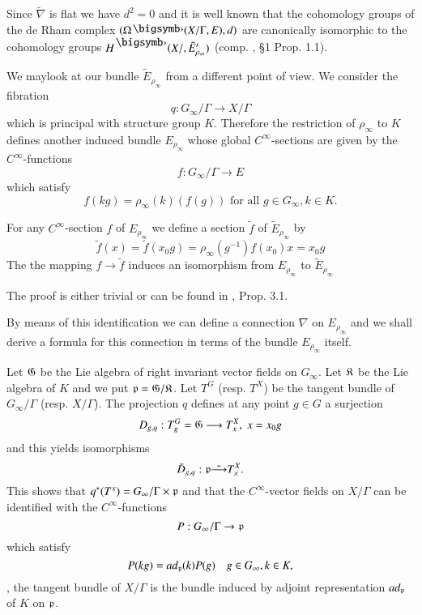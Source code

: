 Since $\tilde{\nabla}$ is flat we have $d^2 = 0$ and it is well known that the cohomology groups of the de Rham complex $(\Omega \bigdot (X/ \Gamma, E), d)$ are canonically isomorphic to the cohomology groups $H^\bigdot (X/ {}, \tilde{E}'_{\rho_\infty})$ (comp. \cite{art5-key10}, \S 1 Prop. 1.1).

We may\pageoriginale look at our bundle $\tilde{E}_{\rho_\infty}$ from a different point of view. We consider the fibration
$$
q : G_\infty/ \Gamma \to X / \Gamma
$$
which is principal with structure group $K$. Therefore the restriction of $\rho_\infty$ to $K$ defines another induced bundle $E_{\rho_\infty}$ whose global $C^{\infty}$-sections are given by the $C^\infty$-functions
$$
f: G_\infty / \Gamma \to E
$$
which satisfy
$$
f (kg) = \rho_\infty (k) (f(g)) \text{ for all } g \in G_\infty, k \in K.
$$

\begin{lemma}\label{art5-lem1.2}
For any $C^\infty$-section $f$ of $E_{\rho_\infty}$ we define a section $\tilde{f}$ of $\tilde{E}_{\rho_\infty}$ by
$$
\tilde{f} (x) = \tilde{f} (x_0 g) = \rho_\infty (g^{-1}) f(x_0) x = x_0 g
$$
The the mapping $f \to \tilde{f}$ induces an isomorphism from $E_{\rho_\infty}$ to $\tilde{E}_{\rho_\infty}$
\end{lemma}

The proof is either trivial or can be found in \cite{art5-key10}, Prop. 3.1.

By means of this identification we can define a connection $\nabla$ on $E_{\rho_\infty}$ and we shall derive a formula for this connection in terms of the bundle $E_{\rho_\infty}$ itself.

Let $\mathfrak{G}$ be the Lie algebra of right invariant vector fields on $G_\infty$. Let $\mathfrak{K}$ be the Lie algebra of $K$ and we put $\mathfrak{p} = \mathfrak{G}/\mathfrak{K}$. Let $T^G$ (resp. $T^X$) be the tangent bundle of $G_\infty /\Gamma$ (resp. $X/ \Gamma$). The projection $q$ defines at any point $g \in G$ a surjection
$$
D_{g, q} : T^G_g  = \mathfrak{G} \longrightarrow T^X_x, \; x  = x_0 g
$$
and this yields isomorphisms
$$
\bar{D}_{g, q} : \mathfrak{p} \tilde{\longrightarrow} T^X_x.
$$
This shows that $q^\ast (T^x) = G_\infty / \Gamma \times \mathfrak{p}$ and that the $C^\infty$-vector fields on $X/ \Gamma$ can be identified with the $C^\infty$-functions
$$
P : G_\infty / \Gamma \to \mathfrak{p}
$$
which satisfy
\begin{equation}
P(kg) = ad_{\mathfrak{p}} (k) P(g) \quad g \in G_\infty, k \in K, 
\label{art5-eq1.3}
\end{equation}
\ie, the tangent bundle of $X/ \Gamma$ is the bundle induced by adjoint representation $ad_{\mathfrak{p}}$ of $K$ on $\mathfrak{p}$.


